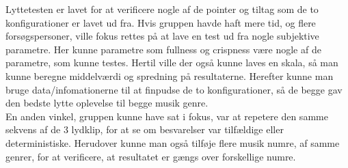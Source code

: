 Lyttetesten er lavet for at verificere nogle af de pointer og tiltag som de to konfigurationer er lavet ud fra. Hvis gruppen havde haft mere tid, og flere forsøgspersoner, ville fokus rettes på at lave en test ud fra nogle subjektive parametre. Her kunne parametre som fullness og crispness være nogle af de parametre, som kunne testes. Hertil ville der også kunne laves en skala, så man kunne beregne middelværdi og spredning på resultaterne. Herefter kunne man bruge data/infomationerne til at finpudse de to konfigurationer, så de begge gav den bedste lytte oplevelse til begge musik genre.
\\ En anden vinkel, gruppen kunne have sat i fokus, var at repetere den samme sekvens af de 3 lydklip, for at se om besvarelser var tilfældige eller deterministiske. Herudover kunne man også tilføje flere musik numre, af samme genrer, for at verificere, at resultatet er gængs over forskellige numre. 

      
